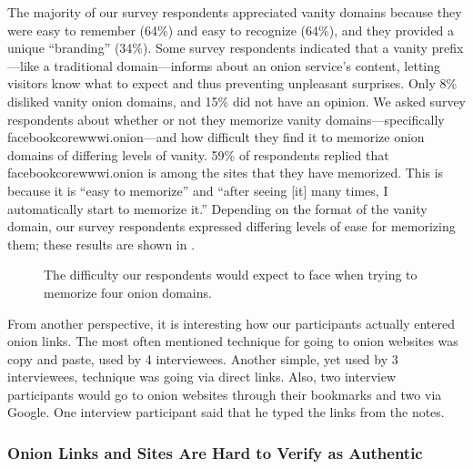 The majority of our survey respondents appreciated vanity domains because they
were easy to remember (64\%) and easy to recognize (64\%), and they provided a
unique ``branding'' (34\%).  Some survey respondents indicated that a vanity
prefix---like a traditional domain---informs about an onion service's content,
letting visitors know what to expect and thus preventing unpleasant surprises.
Only 8\% disliked vanity onion domains, and 15\% did not have an opinion.  We
asked survey respondents about whether or not they memorize vanity
domains---specifically facebookcorewwwi.onion---and how difficult they find it
to memorize onion domains of differing levels of vanity.  59\% of respondents
replied that facebookcorewwwi.onion is among the sites that they have memorized.
This is 
because it is ``easy to memorize'' and ``after seeing [it] many times, I
automatically start to memorize it.'' Depending on the format of the vanity
domain, our survey respondents expressed differing levels of ease for memorizing
them; these results are shown in .

\begin{figure}[t]
    \centering
    
    \caption{The difficulty our respondents would expect to face when trying to
    memorize four onion domains.}
    \label{fig:memorize-domains}
\end{figure}

From another perspective, it is interesting how our participants actually
entered onion links. The most often mentioned technique for going to onion
websites was copy and paste, used by 4 interviewees. Another simple, yet used by
3 interviewees, technique was going via direct links.  Also, two interview
participants would go to onion websites through their bookmarks and two via
Google. One interview participant said that he typed the links from the notes.

\subsubsection{Onion Links and Sites Are Hard to Verify as Authentic}

